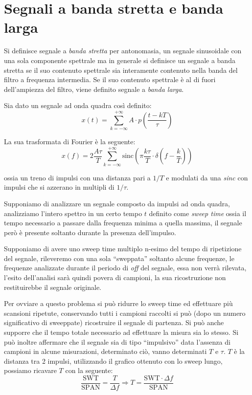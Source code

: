 
\section{Segnali a banda stretta e banda larga}
Si definisce segnale a \textit{banda stretta} per antonomasia, un segnale sinusoidale
con una sola componente spettrale ma in generale
si definisce un segnale a banda stretta se il suo contenuto spettrale
sia interamente contenuto nella banda del filtro a frequenza intermedia.
Se il suo contenuto spettrale è al di fuori dell'ampiezza del filtro,
viene definito segnale a \textit{banda larga}.

Sia dato un segnale ad onda quadra così definito:
$$
x(t) = \sum_{k = -\infty}^{+\infty} A\cdot p\left(\frac{t-kT}{\tau}\right)
$$

La sua trasformata di Fourier è la seguente:
$$
x(f) = 2 \frac{A\tau}{T} \sum_{k=-\infty}^{+\infty} \text{sinc} \left(\pi \frac{k\tau}{T}\cdot  \delta\left(f-\frac{k}{T}\right)  \right)
$$

ossia un treno di impulsi con una distanza pari a $1/T$ e modulati
da una \textit{sinc} con impulsi che si azzerano in multipli di $1/\tau$.

Supponiamo di analizzare un segnale composto da impulsi ad onda quadra,
analizziamo l'intero spettro in un certo tempo $t$ definito come \textit{sweep time}
ossia il tempo necessario a passare dalla frequenza minima a quella massima,
il segnale però è presente soltanto durante la presenza dell'impulso.

\begin{figure}[h] %
    \centering
    \def\svgwidth{0.6\columnwidth}
    
\end{figure}


Supponiamo di avere uno sweep time multiplo n-esimo
del tempo di ripetizione del segnale, rileveremo con una sola ``sweppata''
soltanto alcune frequenze, le frequenze analizzate durante il periodo di \textit{off}
del segnale, essa non verrà rilevata, l'esito dell'analisi sarà quindi povera di campioni,
la sua ricostruzione non restituirebbe il segnale originale.

Per ovviare a questo problema si può ridurre lo sweep time ed effettuare più scansioni
ripetute, conservando tutti i campioni raccolti si può (dopo un numero significativo di sweeppate)
ricostruire il segnale di partenza. Si può anche supporre che il tempo totale necessario ad effettuare
la misura sia lo stesso.
Si può inoltre affermare che il segnale sia di tipo ``impulsivo'' data l'assenza di campioni in
alcune misurazioni, determinato ciò, vanno determinati $T$ e $\tau$.
$T$ è la distanza tra 2 impulsi, utilizzando il grafico ottenuto con lo sweep lungo,
possiamo ricavare $T$ con la seguente:
$$
    \frac{\text{SWT}}{\text{SPAN}} = \frac{T}{\Delta f} \Rightarrow T = \frac{\text{SWT}\cdot\Delta f}{\text{SPAN}}
$$


